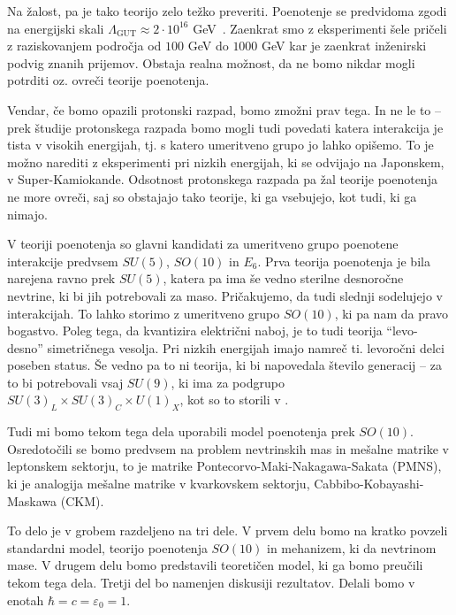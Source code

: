 Na žalost, pa je tako teorijo zelo težko preveriti. Poenotenje se predvidoma zgodi na energijski skali
$\Lambda_\text{GUT} \approx 2 \cdot 10^{16}$ GeV~\cite{mohapatra}. Zaenkrat smo z eksperimenti šele
pričeli z raziskovanjem področja od $100$ GeV do $1000$ GeV kar je zaenkrat inženirski podvig znanih
prijemov. Obstaja realna možnost, da ne bomo nikdar mogli potrditi oz. ovreči teorije poenotenja.

Vendar, če bomo opazili protonski razpad, bomo zmožni prav tega. In ne le to -- prek študije
protonskega razpada bomo mogli tudi povedati katera interakcija je tista v visokih energijah, tj. s
katero umeritveno grupo jo lahko opišemo. To je možno narediti z eksperimenti pri nizkih energijah,
ki se odvijajo na Japonskem, v Super-Kamiokande. Odsotnost protonskega razpada pa žal teorije poenotenja
ne more ovreči, saj so obstajajo tako teorije, ki ga vsebujejo, kot tudi, ki ga nimajo.

V teoriji poenotenja so glavni kandidati za umeritveno grupo poenotene interakcije predvsem $SU(5)$,
$SO(10)$ in $E_6$. Prva teorija poenotenja je bila narejena ravno prek $SU(5)$, katera pa ima še vedno
sterilne desnoročne nevtrine, ki bi jih potrebovali za maso. Pričakujemo, da tudi slednji sodelujejo
v interakcijah. To lahko storimo z umeritveno grupo $SO(10)$, ki pa nam da pravo bogastvo. Poleg tega,
da kvantizira električni naboj, je to tudi teorija "`levo-desno"' simetričnega vesolja. Pri nizkih
energijah imajo namreč ti. levoročni delci poseben status. Še vedno pa to ni teorija, ki bi napovedala
število generacij -- za to bi potrebovali vsaj $SU(9)$, ki ima za podgrupo
$SU(3)_L\times SU(3)_C\times U(1)_X$, kot so to storili v \cite{SU9}.

Tudi mi bomo tekom tega dela uporabili model poenotenja prek $SO(10)$. Osredotočili se bomo predvsem
na problem nevtrinskih mas in mešalne matrike v leptonskem sektorju, to je matrike
Pontecorvo-Maki-Nakagawa-Sakata (PMNS), ki je analogija mešalne matrike v kvarkovskem sektorju,
Cabbibo-Kobayashi-Maskawa (CKM).

To delo je v grobem razdeljeno na tri dele. V prvem delu bomo na kratko povzeli standardni model,
teorijo poenotenja $SO(10)$ in mehanizem, ki da nevtrinom mase. V drugem delu bomo predstavili
teoretičen model, ki ga bomo preučili tekom tega dela. Tretji del bo namenjen diskusiji rezultatov.
Delali bomo v enotah $\hbar = c = \varepsilon_0 = 1$.
